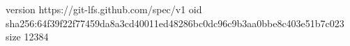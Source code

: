 version https://git-lfs.github.com/spec/v1
oid sha256:64f39f22f77459da8a3cd40011ed48286bc0dc96c9b3aa0bbe8c403e51b7c023
size 12384
